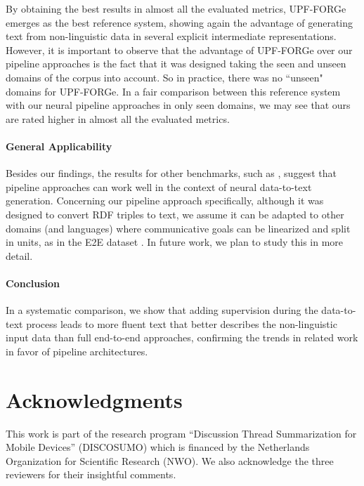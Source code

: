 \documentclass[11pt,a4paper]{article}
\begin{document}
By obtaining the best results in almost all the evaluated metrics, UPF-FORGe emerges as the best reference system, showing again the advantage of generating text from non-linguistic data in several explicit intermediate representations. However, it is important to observe that the advantage of UPF-FORGe over our pipeline approaches is the fact that it was designed taking the seen and unseen domains of the corpus into account. So in practice, there was no ``unseen" domains for UPF-FORGe. In a fair comparison between this reference system with our neural pipeline approaches in only seen domains, we may see that ours are rated higher in almost all the evaluated metrics.

\paragraph{General Applicability} Besides our findings, the results for other benchmarks, such as , suggest that pipeline approaches can work well in the context of neural data-to-text generation. Concerning our pipeline approach specifically, although it was designed to convert RDF triples to text, we assume it can be adapted to other domains (and languages) where communicative goals can be linearized and split in units, as in the E2E dataset \cite{novikova2017b}. In future work, we plan to study this in more detail.

\paragraph{Conclusion} In a systematic comparison, we show that adding supervision during the data-to-text process leads to more fluent text that better describes the non-linguistic input data than full end-to-end approaches, confirming the trends in related work in favor of pipeline architectures.

\section*{Acknowledgments}

This work is part of the research program ``Discussion Thread Summarization for Mobile Devices'' (DISCOSUMO) which is financed by the Netherlands Organization for Scientific Research (NWO). We also acknowledge the three reviewers for their insightful comments.




\clearpage
\appendix
\end{document}
